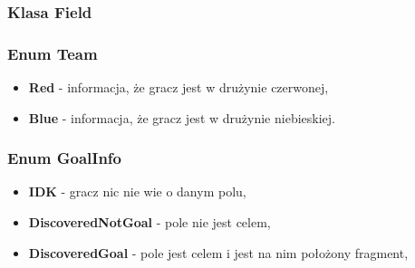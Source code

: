 \documentclass[../Dokumentacja.tex]{subfiles}
\begin{document}
\subsubsection{Klasa Field}
\begin{itemize}
\end{itemize}
\subsubsection{Enum Team}
\begin{itemize}
    \item \textbf{Red} - informacja, że gracz jest w drużynie czerwonej,
    \item \textbf{Blue} - informacja, że gracz jest w drużynie niebieskiej.
\end{itemize}
\subsubsection{Enum GoalInfo}
\begin{itemize}
    \item \textbf{IDK} - gracz nic nie wie o danym polu,
    \item \textbf{DiscoveredNotGoal} - pole nie jest celem,
    \item \textbf{DiscoveredGoal} - pole jest celem i jest na nim położony fragment,
\end{itemize}
\end{document}
